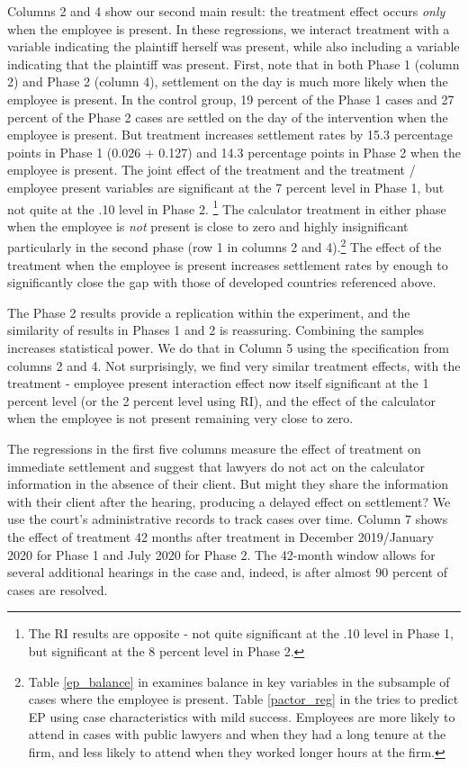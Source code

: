 \documentclass[11pt, a4paper]{article}
\begin{document}
Columns 2 and 4 show our second main result: the treatment effect occurs \textit{only} when the employee is present. In these regressions, we interact treatment with a variable indicating the plaintiff herself was present, while also including a variable indicating that the plaintiff was present. First, note that in both Phase 1 (column 2) and Phase 2 (column 4), settlement on the day is much more likely when the employee is present. In the control group, 19 percent of the Phase 1 cases and 27 percent of the Phase 2 cases are settled on the day of the intervention when the employee is present. But treatment increases settlement rates by 15.3 percentage points in Phase 1 (0.026 + 0.127) and 14.3 percentage points in Phase 2 when the employee is present. The joint effect of the treatment and the treatment / employee present variables are significant at the 7 percent level in Phase 1, but not quite at the .10 level in Phase 2. \footnote{The RI results are opposite - not quite significant at the .10 level in Phase 1, but significant at the 8 percent level in Phase 2.} The calculator treatment in either phase  when the employee is \textit{not} present is close to zero and highly insignificant particularly in the second phase (row 1 in columns 2 and 4).\footnote{Table \ref{ep_balance} in  examines balance in key variables in the subsample of cases where the employee is present. Table \ref{pactor_reg} in the  tries to predict EP using case characteristics with mild success. Employees are more likely to attend in cases with public lawyers and when they had a long tenure at the firm, and less likely to attend when they worked longer hours at the firm.} The effect of the treatment when the employee is present increases settlement rates by enough to significantly close the gap with those of developed countries referenced above. 

The Phase 2 results provide a replication within the experiment, and the similarity of results in Phases 1 and 2 is reassuring. Combining the samples increases statistical power. We do that in Column 5 using the specification from columns 2 and 4. Not surprisingly, we find very similar treatment effects, with the treatment - employee present interaction effect now itself significant at the 1 percent level (or the 2 percent level using RI), and the effect of the calculator when the employee is not present remaining very close to zero. 

The regressions in the first five columns measure the effect of treatment on immediate settlement and suggest that lawyers do not act on the calculator information in the absence of their client. But might they share the information with their client after the hearing, producing a delayed effect on settlement? We use the court's administrative records to track cases over time. Column 7 shows the effect of treatment 42 months after treatment in December 2019/January 2020 for Phase 1 and July 2020 for Phase 2. The 42-month window allows for several additional hearings in the case and, indeed, is after almost 90 percent of cases are resolved.
\end{document}
